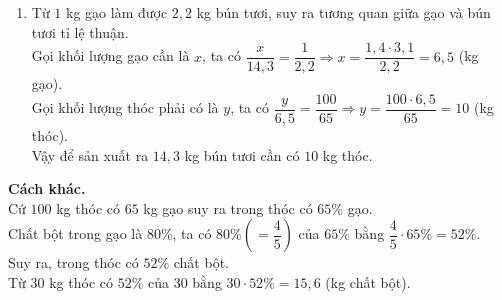 \begin{vd}
{\begin{enumerate}
			Vậy trong $30$ kg thóc có $15{,}6$ kg chất bột.
			\item Từ $1$ kg gạo làm được $2{,}2$ kg bún tươi, suy ra tương quan giữa gạo và bún tươi tỉ lệ thuận.\\
			Gọi khối lượng gạo cần là $x$, ta có $\dfrac{x}{14{,}3}=\dfrac{1}{2{,}2}\Rightarrow x=\dfrac{1{,}4 \cdot 3{,}1}{2{,}2}=6{,}5$ (kg gạo).\\
			Gọi khối lượng thóc phải có là $y$, ta có $\dfrac{y}{6{,}5}=\dfrac{100}{65}\Rightarrow y=\dfrac{100 \cdot 6{,}5}{65}=10$ (kg thóc).\\
			Vậy để sản xuất ra $14{,}3$ kg bún tươi cần có $10$ kg thóc.
		\end{enumerate}
		\textbf{Cách khác.\\}
		Cứ $100$ kg thóc có $65$ kg gạo suy ra trong thóc có $65\% $ gạo.\\
		Chất bột trong gạo là $80\%$, ta có $80\%\left(=\dfrac{4}{5}\right)$ của $65\%$ bằng $\dfrac{4}{5} \cdot 65\%=52\% $.\\
		Suy ra, trong thóc có $52\%$ chất bột.\\
		Từ $30$ kg thóc có $52\% $ của $30$ bằng $ 30 \cdot 52\%=15{,}6$ (kg chất bột).
	}
\end{vd}

